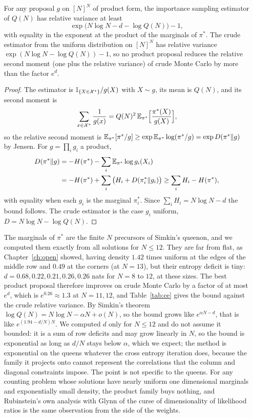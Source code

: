 \begin{theorem}
\label{thm:product}
For any proposal $g$ on $[N]^N$ of product form, the importance sampling estimator of $Q(N)$ has relative variance at least
\[
\exp\big( N \log N - d - \log Q(N) \big) - 1 ,
\]
with equality in the exponent at the product of the marginals of $\pi^*$. The crude estimator from the uniform distribution on $[N]^N$ has relative variance $\exp( N \log N - \log Q(N) ) - 1$, so no product proposal reduces the relative second moment (one plus the relative variance) of crude Monte Carlo by more than the factor $e^{d}$.
\end{theorem}

\begin{proof}
The estimator is $\mathbb{I}_{\{X \in \mathcal{X}^*\}} / g(X)$ with $X \sim g$, its mean is $Q(N)$, and its second moment is
\[
\sum_{x \in \mathcal{X}^*} \frac{1}{g(x)} = Q(N)^2 \, \mathbb{E}_{\pi^*}\Big[ \frac{\pi^*(X)}{g(X)} \Big] ,
\]
so the relative second moment is $\mathbb{E}_{\pi^*}[\pi^* / g] \ge \exp \mathbb{E}_{\pi^*} \log(\pi^* / g) = \exp D(\pi^* \| g)$ by Jensen. For $g = \prod_i g_i$ a product,
\begin{align*}
D(\pi^* \| g) &= -H(\pi^*) - \sum_i \mathbb{E}_{\pi^*} \log g_i(X_i) \\
&= -H(\pi^*) + \sum_i \big( H_i + D(\pi^*_i \| g_i) \big) \ge \sum_i H_i - H(\pi^*),
\end{align*}
with equality when each $g_i$ is the marginal $\pi^*_i$. Since $\sum_i H_i = N \log N - d$ the bound follows. The crude estimator is the case $g_i$ uniform, $D = N \log N - \log Q(N)$.
\end{proof}

The marginals of $\pi^*$ are the finite $N$ precursors of Simkin's queenon, and we computed them exactly from all solutions for $N \le 12$. They are far from flat, as Chapter~\ref{ch:open} showed, having density $1.42$ times uniform at the edges of the middle row and $0.49$ at the corners (at $N = 13$), but their entropy deficit is tiny: $d = 0.68, 0.22, 0.21, 0.26, 0.26$ nats for $N = 8$ to $12$, at these sizes. The best product proposal therefore improves on crude Monte Carlo by a factor of at most $e^{d}$, which is $e^{0.26} \approx 1.3$ at $N = 11, 12$, and Table~\ref{tab:ce} gives the bound against the crude relative variance. By Simkin's theorem $\log Q(N) = N \log N - \alpha N + o(N)$, so the bound grows like $e^{\alpha N - d}$, that is like $e^{(1.94 - d/N) N}$. We computed $d$ only for $N \le 12$ and do not assume it bounded: it is a sum of row deficits and may grow linearly in $N$, so the bound is exponential as long as $d / N$ stays below $\alpha$, which we expect; the method is exponential on the queens whatever the cross entropy iteration does, because the family it projects onto cannot represent the correlations that the column and diagonal constraints impose. The point is not specific to the queens. For any counting problem whose solutions have nearly uniform one dimensional marginals and exponentially small density, the product family buys nothing, and Rubinstein's own analysis with Glynn \cite{RubinsteinGlynn} of the curse of dimensionality of likelihood ratios is the same observation from the side of the weights.

